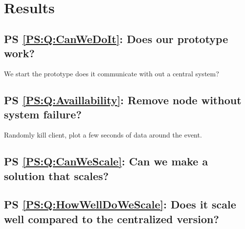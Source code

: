 
\chapter{Results}

\section{PS \ref{PS:Q:CanWeDoIt}: Does our prototype work?}
We start the prototype does it communicate with out a central system?


\section{PS \ref{PS:Q:Availlability}: Remove node without system failure?}
Randomly kill client, plot a few seconds of data around the event.

\section{PS \ref{PS:Q:CanWeScale}: Can we make a solution that scales?}




\section{PS \ref{PS:Q:HowWellDoWeScale}: Does it scale well compared to the centralized version?}



